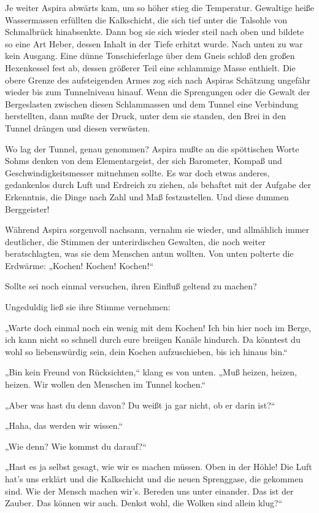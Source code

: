 Je weiter Aspira abwärts kam, um so höher stieg die Temperatur.
Gewaltige heiße Wassermassen erfüllten die Kalkschicht, die sich
tief unter die Talsohle von Schmalbrück hinabsenkte. Dann bog sie
sich wieder steil nach oben und bildete so eine Art Heber, dessen
Inhalt in der Tiefe erhitzt wurde. Nach unten zu war kein Ausgang.
Eine dünne Tonschieferlage über dem Gneis schloß den großen
Hexenkessel fest ab, dessen größerer Teil eine schlammige Masse
enthielt. Die obere Grenze des aufsteigenden Armes zog sich nach
Aspiras Schätzung ungefähr wieder bis zum Tunnelniveau hinauf. Wenn
die Sprengungen oder die Gewalt der Bergeslasten zwischen diesen
Schlammassen und dem Tunnel eine Verbindung herstellten, dann mußte
der Druck, unter dem sie standen, den Brei in den Tunnel drängen
und diesen verwüsten.

Wo lag der Tunnel, genau genommen? Aspira mußte an die spöttischen
Worte Sohms denken von dem Elementargeist, der sich Barometer,
Kompaß und Geschwindigkeitsmesser mitnehmen sollte. Es war doch
etwas anderes, gedankenlos durch Luft und Erdreich zu ziehen, als
behaftet mit der Aufgabe der Erkenntnis, die Dinge nach Zahl und
Maß festzustellen. Und diese dummen Berggeister!

Während Aspira sorgenvoll nachsann, vernahm sie wieder, und
allmählich immer deutlicher, die Stimmen der unterirdischen
Gewalten, die noch weiter beratschlagten, was sie dem Menschen
antun wollten. Von unten polterte die Erdwärme: „Kochen! Kochen!
Kochen!“

Sollte sei noch einmal versuchen, ihren Einfluß geltend zu machen?

Ungeduldig ließ sie ihre Stimme vernehmen:

„Warte doch einmal noch ein wenig mit dem Kochen! Ich bin hier noch
im Berge, ich kann nicht so schnell durch eure breiigen Kanäle
hindurch. Da könntest du wohl so liebenswürdig sein, dein Kochen
aufzuschieben, bis ich hinaus bin.“

„Bin kein Freund von Rücksichten,“ klang es von unten. „Muß heizen,
heizen, heizen. Wir wollen den Menschen im Tunnel kochen.“

„Aber was hast du denn davon? Du weißt ja gar nicht, ob er darin
ist?“

„Haha, das werden wir wissen.“

„Wie denn? Wie kommst du darauf?“

„Hast es ja selbst gesagt, wie wir es machen müssen. Oben in der
Höhle! Die Luft hat's uns erklärt und die Kalkschicht und die neuen
Sprenggase, die gekommen sind. Wie der Mensch machen wir's. Bereden
uns unter einander. Das ist der Zauber. Das können wir auch. Denkst
wohl, die Wolken sind allein klug?“

